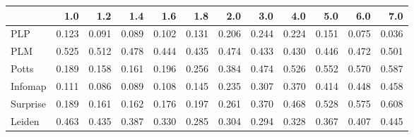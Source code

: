 \begin{tabular}{lrrrrrrrrrrr}
\toprule
{} &   1.0 &   1.2 &   1.4 &   1.6 &   1.8 &   2.0 &   3.0 &   4.0 &   5.0 &   6.0 &   7.0 \\
\midrule
PLP      & 0.123 & 0.091 & 0.089 & 0.102 & 0.131 & 0.206 & 0.244 & 0.224 & 0.151 & 0.075 & 0.036 \\
PLM      & 0.525 & 0.512 & 0.478 & 0.444 & 0.435 & 0.474 & 0.433 & 0.430 & 0.446 & 0.472 & 0.501 \\
Potts    & 0.189 & 0.158 & 0.161 & 0.196 & 0.256 & 0.384 & 0.474 & 0.526 & 0.552 & 0.570 & 0.587 \\
Infomap  & 0.111 & 0.086 & 0.089 & 0.108 & 0.145 & 0.235 & 0.307 & 0.370 & 0.414 & 0.448 & 0.458 \\
Surprise & 0.189 & 0.161 & 0.162 & 0.176 & 0.197 & 0.261 & 0.370 & 0.468 & 0.528 & 0.575 & 0.608 \\
Leiden   & 0.463 & 0.435 & 0.387 & 0.330 & 0.285 & 0.304 & 0.294 & 0.328 & 0.367 & 0.407 & 0.445 \\
\bottomrule
\end{tabular}

